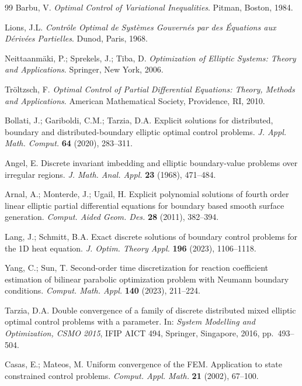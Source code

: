 \documentclass[11pt]{article}
\begin{document}
\begin{thebibliography}{99}
Barbu, V.
{\em Optimal Control of Variational Inequalities}.
Pitman, Boston, 1984.

Lions, J.L.
{\em Contrôle Optimal de Systèmes Gouvernés par des Équations aux Dérivées Partielles}.
Dunod, Paris, 1968.

Neittaanmäki, P.; Sprekels, J.; Tiba, D.
{\em Optimization of Elliptic Systems: Theory and Applications}.
Springer, New York, 2006.

Tröltzsch, F.
{\em Optimal Control of Partial Differential Equations: Theory, Methods and Applications}.
American Mathematical Society, Providence, RI, 2010.

Bollati, J.; Gariboldi, C.M.; Tarzia, D.A.
Explicit solutions for distributed, boundary and distributed-boundary elliptic optimal control problems.
{\em J. Appl. Math. Comput.} {\bf 64} (2020), 283--311.

Angel, E.
Discrete invariant imbedding and elliptic boundary-value problems over irregular regions.
{\em J. Math. Anal. Appl.} {\bf 23} (1968), 471--484.

Arnal, A.; Monterde, J.; Ugail, H.
Explicit polynomial solutions of fourth order linear elliptic partial differential equations for boundary based smooth surface generation.
{\em Comput. Aided Geom. Des.} {\bf 28} (2011), 382--394.

Lang, J.; Schmitt, B.A.
Exact discrete solutions of boundary control problems for the 1D heat equation.
{\em J. Optim. Theory Appl.} {\bf 196} (2023), 1106--1118.

Yang, C.; Sun, T.
Second-order time discretization for reaction coefficient estimation of bilinear parabolic optimization problem with Neumann boundary conditions.
{\em Comput. Math. Appl.} {\bf 140} (2023), 211--224.

Tarzia, D.A.
Double convergence of a family of discrete distributed mixed elliptic optimal control problems with a parameter.
In: {\em System Modelling and Optimization, CSMO 2015}, IFIP AICT 494, Springer, Singapore, 2016, pp.~493--504.

Casas, E.; Mateos, M.
Uniform convergence of the FEM. Application to state constrained control problems.
{\em Comput. Appl. Math.} {\bf 21} (2002), 67--100.

\end{thebibliography}
\end{document}
